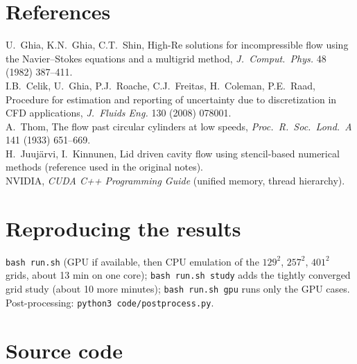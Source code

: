 \section*{References}
\small
U.\ Ghia, K.N.\ Ghia, C.T.\ Shin, High-Re solutions for incompressible flow using the Navier--Stokes equations and a multigrid method, \emph{J.\ Comput.\ Phys.} 48 (1982) 387--411.\\
I.B.\ Celik, U.\ Ghia, P.J.\ Roache, C.J.\ Freitas, H.\ Coleman, P.E.\ Raad, Procedure for estimation and reporting of uncertainty due to discretization in CFD applications, \emph{J.\ Fluids Eng.} 130 (2008) 078001.\\
A.\ Thom, The flow past circular cylinders at low speeds, \emph{Proc.\ R.\ Soc.\ Lond.\ A} 141 (1933) 651--669.\\
H.\ Juuj\"arvi, I.\ Kinnunen, Lid driven cavity flow using stencil-based numerical methods (reference used in the original notes).\\
NVIDIA, \emph{CUDA C++ Programming Guide} (unified memory, thread hierarchy).
\normalsize
\section*{Reproducing the results}
\texttt{bash run.sh} (GPU if available, then CPU emulation of the $129^2$, $257^2$, $401^2$ grids, about 13 min on one core); \texttt{bash run.sh study} adds the tightly converged grid study (about 10 more minutes); \texttt{bash run.sh gpu} runs only the GPU cases. Post-processing: \texttt{python3 code/postprocess.py}.

\appendix\section{Source code}


